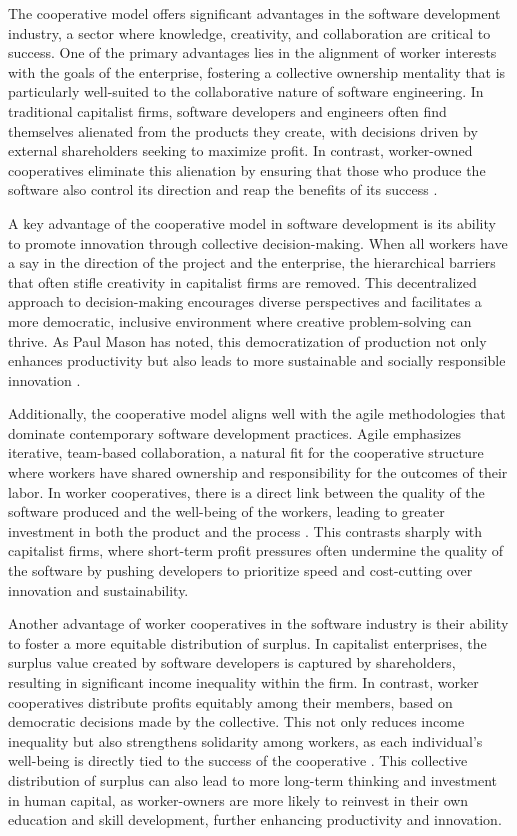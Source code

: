 \begin{refsection}
The cooperative model offers significant advantages in the software development industry, a sector where knowledge, creativity, and collaboration are critical to success. One of the primary advantages lies in the alignment of worker interests with the goals of the enterprise, fostering a collective ownership mentality that is particularly well-suited to the collaborative nature of software engineering. In traditional capitalist firms, software developers and engineers often find themselves alienated from the products they create, with decisions driven by external shareholders seeking to maximize profit. In contrast, worker-owned cooperatives eliminate this alienation by ensuring that those who produce the software also control its direction and reap the benefits of its success \cite[pp.~120-122]{schweickart2002}.

A key advantage of the cooperative model in software development is its ability to promote innovation through collective decision-making. When all workers have a say in the direction of the project and the enterprise, the hierarchical barriers that often stifle creativity in capitalist firms are removed. This decentralized approach to decision-making encourages diverse perspectives and facilitates a more democratic, inclusive environment where creative problem-solving can thrive. As Paul Mason has noted, this democratization of production not only enhances productivity but also leads to more sustainable and socially responsible innovation \cite[pp.~88-90]{mason2015}.

Additionally, the cooperative model aligns well with the agile methodologies that dominate contemporary software development practices. Agile emphasizes iterative, team-based collaboration, a natural fit for the cooperative structure where workers have shared ownership and responsibility for the outcomes of their labor. In worker cooperatives, there is a direct link between the quality of the software produced and the well-being of the workers, leading to greater investment in both the product and the process \cite[pp.~41-43]{thompson2014}. This contrasts sharply with capitalist firms, where short-term profit pressures often undermine the quality of the software by pushing developers to prioritize speed and cost-cutting over innovation and sustainability.

Another advantage of worker cooperatives in the software industry is their ability to foster a more equitable distribution of surplus. In capitalist enterprises, the surplus value created by software developers is captured by shareholders, resulting in significant income inequality within the firm. In contrast, worker cooperatives distribute profits equitably among their members, based on democratic decisions made by the collective. This not only reduces income inequality but also strengthens solidarity among workers, as each individual’s well-being is directly tied to the success of the cooperative \cite[pp.~92-94]{wright2010}. This collective distribution of surplus can also lead to more long-term thinking and investment in human capital, as worker-owners are more likely to reinvest in their own education and skill development, further enhancing productivity and innovation.


\end{refsection}
